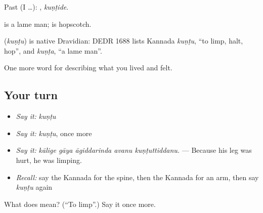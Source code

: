 Past (I …): , \emph{kuṇṭide}.

 is a lame man;  is hopscotch.

\begin{cousinweb}
\textbf{} (\emph{kuṇṭu}) is native Dravidian: DEDR 1688 lists Kannada \emph{kuṇṭu}, \textquotedblleft{}to limp, halt, hop\textquotedblright{}, and \emph{kuṇṭa}, \textquotedblleft{}a lame man\textquotedblright{}.
\end{cousinweb}

\begin{grammarlens}[title={What you've built}]
One more word for describing what you lived and felt.
\end{grammarlens}

\subsection*{Your turn}
\begin{itemize}
\raggedright
  \item \emph{Say it:} \emph{kuṇṭu}
  \item \emph{Say it:} \emph{kuṇṭu}, once more
  \item \emph{Say it:} \emph{kālige gāya āgiddarinda avanu kuṇṭuttiddanu.} — Because his leg was hurt, he was limping.
  \item \emph{Recall:} say the Kannada for the spine, then the Kannada for an arm, then say \emph{kuṇṭu} again
\end{itemize}

\begin{tcolorbox}[breakable,colback=teal!4,colframe=teal!35!black,title={Before you move on}]
What does  mean? (\textquotedblleft{}To limp\textquotedblright{}.) Say it once more.
\end{tcolorbox}
